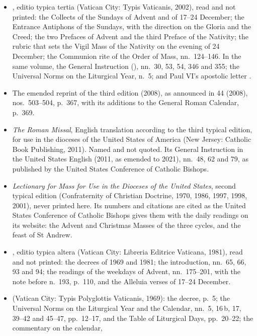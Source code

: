 \begin{itemize}[leftmargin=1.3em, itemsep=0.3em]
\item {}, editio typica tertia (Vatican City: Typis Vaticanis, 2002), read
and not printed: the Collects of the Sundays of Advent and of 17--24 December; the Entrance
Antiphons of the Sundays, with the direction on the Gloria and the Creed; the two Prefaces of
Advent and the third Preface of the Nativity; the rubric that sets the Vigil Mass of the
Nativity on the evening of 24 December; the Communion rite of the Order of Mass,
nn.~124--146. In the same volume, the General Instruction (), nn.~30, 53, 54, 346 and 355; the Universal Norms on the Liturgical Year, n.~5; and
Paul VI's apostolic letter .
\item The emended reprint of the third edition (2008), as announced in  44 (2008),
nos.~503--504, p.~367, with its additions to the General Roman Calendar, p.~369.
\item \textit{The Roman Missal}, English translation according to the third typical edition, for
use in the dioceses of the United States of America (New Jersey: Catholic Book Publishing, 2011).
Named and not quoted. Its General Instruction in the United States English (2011, as emended to
2021), nn.~48, 62 and 79, as published by the United States Conference of Catholic Bishops.
\item \textit{Lectionary for Mass for Use in the Dioceses of the United States}, second typical
edition (Confraternity of Christian Doctrine, 1970, 1986, 1997, 1998, 2001), never printed here. Its
numbers and citations are cited as the United States Conference of Catholic Bishops gives them
with the daily readings on its website: the Advent and Christmas Masses of the three cycles, and
the feast of St Andrew.
\item {}, editio typica altera (Vatican City: Libreria Editrice
Vaticana, 1981), read and not printed: the decrees of 1969 and 1981; the introduction, nn.~65, 66,
93 and 94; the readings of the weekdays of Advent, nn.~175--201, with the note before n.~193,
p.~110, and the Alleluia verses of 17--24 December.
\item {} (Vatican City: Typis Polyglottis Vaticanis, 1969): the decree,
p.~5; the Universal Norms on the Liturgical Year and the Calendar, nn.~5, 16\,b, 17, 39--42 and
45--47, pp.~12--17, and the Table of Liturgical Days, pp.~20--22; the commentary on the calendar,

\end{itemize}
